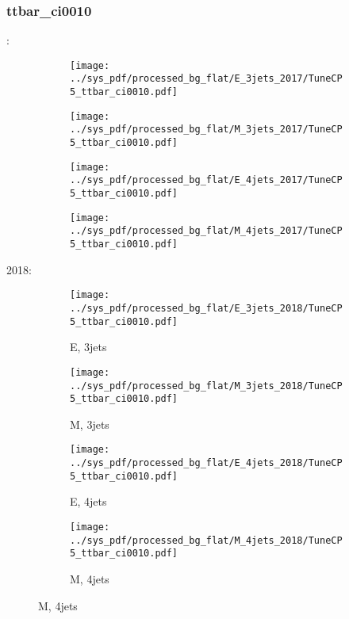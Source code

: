\documentclass{beamer}
\begin{document}
\begin{frame}
\frametitle{ttbar_ci0010}
\fontsize{5}{1}:
\begin{figure}
\centering
\begin{subfigure}[b]{0.24\textwidth}
\texttt{[image: ../sys\_pdf/processed\_bg\_flat/E\_3jets\_2017/TuneCP5\_ttbar\_ci0010.pdf]}
\end{subfigure}
\begin{subfigure}[b]{0.24\textwidth}
\texttt{[image: ../sys\_pdf/processed\_bg\_flat/M\_3jets\_2017/TuneCP5\_ttbar\_ci0010.pdf]}
\end{subfigure}
\begin{subfigure}[b]{0.24\textwidth}
\texttt{[image: ../sys\_pdf/processed\_bg\_flat/E\_4jets\_2017/TuneCP5\_ttbar\_ci0010.pdf]}
\end{subfigure}
\begin{subfigure}[b]{0.24\textwidth}
\texttt{[image: ../sys\_pdf/processed\_bg\_flat/M\_4jets\_2017/TuneCP5\_ttbar\_ci0010.pdf]}
\end{subfigure}
\end{figure}
2018:
\begin{figure}
\centering
\begin{subfigure}[b]{0.24\textwidth}
\texttt{[image: ../sys\_pdf/processed\_bg\_flat/E\_3jets\_2018/TuneCP5\_ttbar\_ci0010.pdf]}
\captionsetup{font=tiny}
\caption{E, 3jets}
\end{subfigure}
\begin{subfigure}[b]{0.24\textwidth}
\texttt{[image: ../sys\_pdf/processed\_bg\_flat/M\_3jets\_2018/TuneCP5\_ttbar\_ci0010.pdf]}
\captionsetup{font=tiny}
\caption{M, 3jets}
\end{subfigure}
\begin{subfigure}[b]{0.24\textwidth}
\texttt{[image: ../sys\_pdf/processed\_bg\_flat/E\_4jets\_2018/TuneCP5\_ttbar\_ci0010.pdf]}
\captionsetup{font=tiny}
\caption{E, 4jets}
\end{subfigure}
\begin{subfigure}[b]{0.24\textwidth}
\texttt{[image: ../sys\_pdf/processed\_bg\_flat/M\_4jets\_2018/TuneCP5\_ttbar\_ci0010.pdf]}
\captionsetup{font=tiny}
\caption{M, 4jets}
\end{subfigure}
\end{figure}
\end{frame}
\end{document}
